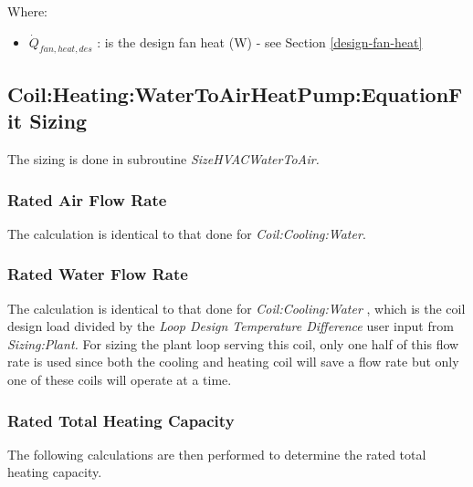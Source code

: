 Where:

\begin{itemize}
\item
  \(\dot{Q}_{fan,heat,des}\) : is the design fan heat (W) - see Section \ref{design-fan-heat}
\end{itemize}

\subsection{Coil:Heating:WaterToAirHeatPump:EquationFit Sizing}\label{coilheatingwatertoairheatpumpequationfit-sizing}

The sizing is done in subroutine \emph{SizeHVACWaterToAir.}

\subsubsection{Rated Air Flow Rate}\label{rated-air-flow-rate-2}

The calculation is identical to that done for \emph{Coil:Cooling:Water}.

\subsubsection{Rated Water Flow Rate}\label{rated-water-flow-rate-2}

The calculation is identical to that done for \emph{Coil:Cooling:Water} , which is the coil design load divided by the \emph{Loop Design Temperature Difference} user input from \emph{Sizing:Plant.} For sizing the plant loop serving this coil, only one half of this flow rate is used since both the cooling and heating coil will save a flow rate but only one of these coils will operate at a time.



\subsubsection{Rated Total Heating Capacity}\label{rated-total-heating-capacity}

The following calculations are then performed to determine the rated total heating capacity.

